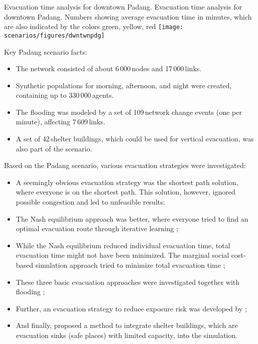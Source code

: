 %
\createfigure%
{Evacuation time analysis for downtown Padang.}%
{Evacuation time analysis for downtown Padang. Numbers showing average evacuation time in minutes, which are also indicated by the colors green, yellow, red}%
{\label{chap:using:padang}}%
{\texttt{[image: scenarios/figures/dwntwnpdg]}}%
{}

Key Padang scenario facts:
\begin{itemize}\styleItemize
\item The network consisted of about 6\,000\,nodes and 17\,000\,links.
\item Synthetic populations for morning, afternoon, and night were created, containing up to 330\,000\,agents.
\item The flooding was modeled by a set of 109\,network change events (one per minute), affecting 7\,609\,links.
\item A set of 42\,shelter buildings, which could be used for vertical evacuation, was also part of the scenario.
\end{itemize}
Based on the Padang scenario, various evacuation strategies were investigated:
\begin{itemize}\styleItemize
\item A seemingly obvious evacuation strategy was the shortest path solution, where everyone is on the shortest path. This solution, however, ignored possible congestion and led to unfeasible results:
\item The Nash equilibrium approach was better, where everyone tried to find an optimal evacuation route through iterative learning \citep{00LaemmelKluepfelNagel2009EvacPadangAtBookTimmermanns};
\item While the Nash equilibrium reduced individual evacuation time, total evacuation time might not have been minimized. The marginal social cost-based simulation approach tried to minimize total evacuation time \citep{00LaemmelFloetteroed2009KISysOptEvac,00DresslerFloetteroedLaemmelNagelSkutella2010OptimalEvacuationLargeScaleScenarios};
\item These three basic evacuation approaches were investigated together with flooding \citep{00LaemmelGretherNagel2009TimeDependentNetworks,Laemmel_PhDThesis_2011};
\item Further, an evacuation strategy to reduce exposure risk was developed by \citep{00LaemmelKluepfelNagel2010PEDRiskPrinted};
\item And finally, \citet{00FloetteroedLaemmel2010ICECShelterEvac} proposed a method to integrate shelter buildings, which are evacuation sinks (\ie safe places) 
with limited capacity, into the simulation.  
\end{itemize}

